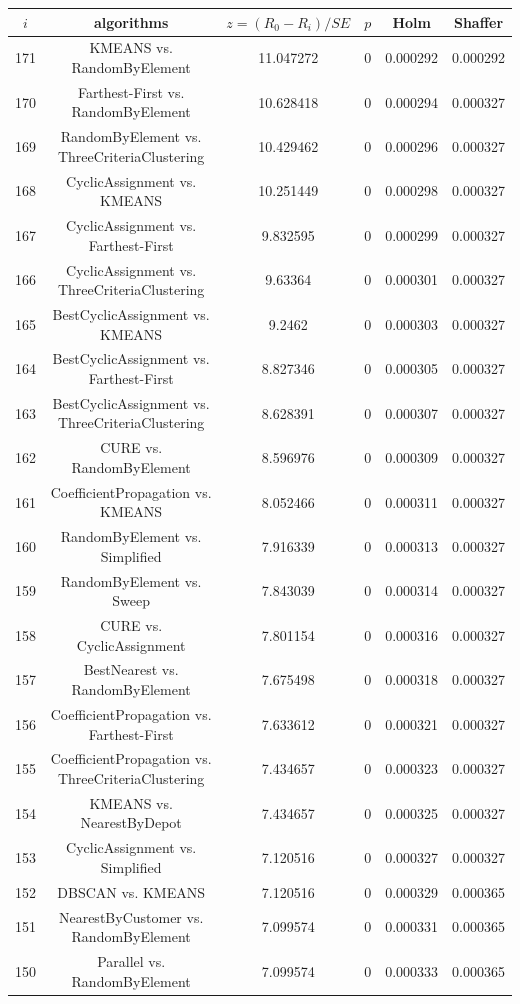 \documentclass[a4paper,10pt]{article}
\begin{document}
\begin{landscape}
\begin{table}[!htp]
\centering\scriptsize
\begin{tabular}{cccccc}
$i$&algorithms&$z=(R_0 - R_i)/SE$&$p$&Holm&Shaffer\\
\hline171&KMEANS vs. RandomByElement&11.047272&0&0.000292&0.000292\\
170&Farthest-First vs. RandomByElement&10.628418&0&0.000294&0.000327\\
169&RandomByElement vs. ThreeCriteriaClustering&10.429462&0&0.000296&0.000327\\
168&CyclicAssignment vs. KMEANS&10.251449&0&0.000298&0.000327\\
167&CyclicAssignment vs. Farthest-First&9.832595&0&0.000299&0.000327\\
166&CyclicAssignment vs. ThreeCriteriaClustering&9.63364&0&0.000301&0.000327\\
165&BestCyclicAssignment vs. KMEANS&9.2462&0&0.000303&0.000327\\
164&BestCyclicAssignment vs. Farthest-First&8.827346&0&0.000305&0.000327\\
163&BestCyclicAssignment vs. ThreeCriteriaClustering&8.628391&0&0.000307&0.000327\\
162&CURE vs. RandomByElement&8.596976&0&0.000309&0.000327\\
161&CoefficientPropagation vs. KMEANS&8.052466&0&0.000311&0.000327\\
160&RandomByElement vs. Simplified&7.916339&0&0.000313&0.000327\\
159&RandomByElement vs. Sweep&7.843039&0&0.000314&0.000327\\
158&CURE vs. CyclicAssignment&7.801154&0&0.000316&0.000327\\
157&BestNearest vs. RandomByElement&7.675498&0&0.000318&0.000327\\
156&CoefficientPropagation vs. Farthest-First&7.633612&0&0.000321&0.000327\\
155&CoefficientPropagation vs. ThreeCriteriaClustering&7.434657&0&0.000323&0.000327\\
154&KMEANS vs. NearestByDepot&7.434657&0&0.000325&0.000327\\
153&CyclicAssignment vs. Simplified&7.120516&0&0.000327&0.000327\\
152&DBSCAN vs. KMEANS&7.120516&0&0.000329&0.000365\\
151&NearestByCustomer vs. RandomByElement&7.099574&0&0.000331&0.000365\\
150&Parallel vs. RandomByElement&7.099574&0&0.000333&0.000365\\

\end{tabular}
\end{table}
\end{landscape}
\end{document}
